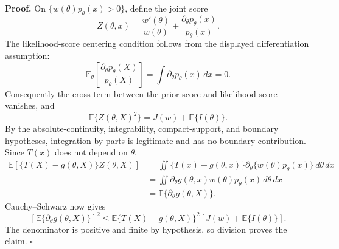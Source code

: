 \textbf{Proof.}
On \(\{w(\theta)p_\theta(x)>0\}\), define the joint score
\[
 Z(\theta,x)=\frac{w'(\theta)}{w(\theta)}+
 \frac{\partial_\theta p_\theta(x)}{p_\theta(x)}.
\]
The likelihood-score centering condition follows from the displayed differentiation assumption:
\[
 \mathbb E_\theta\!\left[
 \frac{\partial_\theta p_\theta(X)}{p_\theta(X)}
 \right]
 =\int\partial_\theta p_\theta(x)\,dx=0.
\]
Consequently the cross term between the prior score and likelihood score vanishes, and
\[
 \mathbb E\{Z(\theta,X)^2\}
 =J(w)+\mathbb E\{I(\theta)\}.
\]
By the absolute-continuity, integrability, compact-support, and boundary hypotheses, integration by parts is legitimate and has no boundary contribution. Since \(T(x)\) does not depend on \(\theta\),
\[
 \begin{aligned}
 \mathbb E[\{T(X)-g(\theta,X)\}Z(\theta,X)]
 &=\iint \{T(x)-g(\theta,x)\}
 \partial_\theta\{w(\theta)p_\theta(x)\}\,d\theta\,dx\\
 &=\iint \partial_\theta g(\theta,x)
 w(\theta)p_\theta(x)\,d\theta\,dx\\
 &=\mathbb E\{\partial_\theta g(\theta,X)\}.
 \end{aligned}
\]
Cauchy--Schwarz now gives
\[
 \left[\mathbb E\{\partial_\theta g(\theta,X)\}\right]^2
 \leq \mathbb E\{T(X)-g(\theta,X)\}^2
 \left[J(w)+\mathbb E\{I(\theta)\}\right].
\]
The denominator is positive and finite by hypothesis, so division proves the claim. \(\square\)
